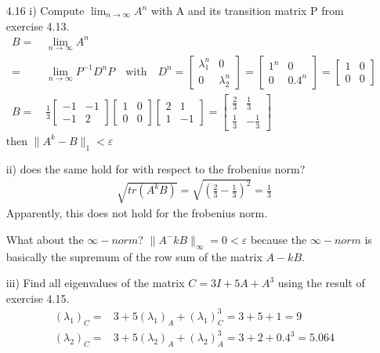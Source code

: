 \documentclass[letterpaper,12pt]{article}
\theoremstyle{definition}
\begin{document}
\begin{enumerate}
\item[4.16]
i) Compute $\lim_{n\rightarrow \infty} A^n$ with A and its transition matrix P from exercise 4.13.
\begin{align*}
B = &\, \lim_{n\rightarrow \infty} A^n \\=&\,  \lim_{n\rightarrow \infty} P^{-1}D^nP \quad \text{with} \quad  D^n= \begin{bmatrix}
\lambda_1^n & 0\\ 0 & \lambda_2^n 
\end{bmatrix} = \begin{bmatrix}
1^n & 0 \\ 0 & 0.4^n
\end{bmatrix} = 
\begin{bmatrix}
1 & 0 \\ 0 & 0 
\end{bmatrix}\\
B  =&\, \frac{1}{3}\begin{bmatrix}
-1 & -1\\ -1 & 2 
\end{bmatrix}\begin{bmatrix}
1& 0 \\ 0 & 0
\end{bmatrix}\begin{bmatrix}
2 & 1 \\ 1 & -1
\end{bmatrix}
=\begin{bmatrix}
\frac{2}{3} & \frac{1}{3} \\ \frac{1}{3} & -\frac{1}{3}
\end{bmatrix}  
\end{align*}
then $\|A^k - B\|_1 < \varepsilon$

ii) does the same hold for with respect to the frobenius norm?
\begin{align*}
\sqrt{tr(A^kB)} = \sqrt{\left(\frac{2}{3} -\frac{1}{3}\right)^2} = \frac{1}{3}
\end{align*}
Apparently, this does not hold for the frobenius norm.

What about the $\infty-norm$?
$\| A^-kB \|_{\infty} = 0 < \varepsilon$ because the  $\infty-norm$ is basically the supremum of the row sum of the matrix $A-kB$.

iii) Find all eigenvalues of the matrix $C= 3I + 5A + A^3$ using the result of exercise 4.15.
\begin{align*}
(\lambda_1)_C =& 3+ 5 (\lambda_1)_A  +  (\lambda_1)_C^3 = 3+5+1=9 \\
(\lambda_2)_C =& 3+ 5 (\lambda_2)_A  +  (\lambda_2)_A^3 = 3+2+0.4^3=5.064 \\  
\end{align*} 


\end{enumerate}
\end{document}
